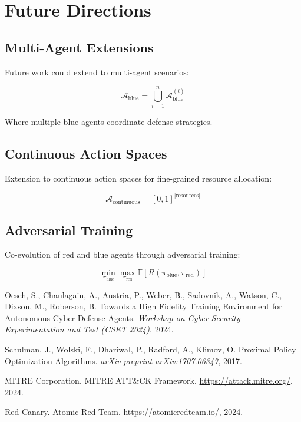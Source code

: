 \documentclass[12pt,a4paper]{article}
\begin{document}
\section{Future Directions}

\subsection{Multi-Agent Extensions}
Future work could extend to multi-agent scenarios:

\begin{equation}
\mathcal{A}_{\text{blue}} = \bigcup_{i=1}^{n} \mathcal{A}_{\text{blue}}^{(i)}
\end{equation}

Where multiple blue agents coordinate defense strategies.

\subsection{Continuous Action Spaces}
Extension to continuous action spaces for fine-grained resource allocation:

\begin{equation}
\mathcal{A}_{\text{continuous}} = [0,1]^{|\text{resources}|}
\end{equation}

\subsection{Adversarial Training}
Co-evolution of red and blue agents through adversarial training:

\begin{equation}
\min_{\pi_{\text{blue}}} \max_{\pi_{\text{red}}} \mathbb{E}[R(\pi_{\text{blue}}, \pi_{\text{red}})]
\end{equation}


\begin{thebibliography}{9}

Oesch, S., Chaulagain, A., Austria, P., Weber, B., Sadovnik, A., Watson, C., Dixson, M., Roberson, B.
\newblock Towards a High Fidelity Training Environment for Autonomous Cyber Defense Agents.
\newblock \emph{Workshop on Cyber Security Experimentation and Test (CSET 2024)}, 2024.

Schulman, J., Wolski, F., Dhariwal, P., Radford, A., Klimov, O.
\newblock Proximal Policy Optimization Algorithms.
\newblock \emph{arXiv preprint arXiv:1707.06347}, 2017.

MITRE Corporation.
\newblock MITRE ATT\&CK Framework.
\newblock \url{https://attack.mitre.org/}, 2024.

Red Canary.
\newblock Atomic Red Team.
\newblock \url{https://atomicredteam.io/}, 2024.

\end{thebibliography}
\end{document}
